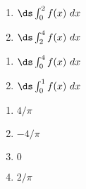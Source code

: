 {\noindent
\begin{minipage}{\linewidth}
\end{minipage}
\noindent\begin{minipage}[t]{.5\linewidth}
\begin{enumerate}
\item		$\ds \int_0^2 f(x)\ dx$
\item		$\ds \int_2^4 f(x)\ dx$
\end{enumerate}
\end{minipage}
\begin{minipage}[t]{.5\linewidth}
\begin{enumerate}\addtocounter{enumii}{2}
\item		$\ds \int_0^4 f(x)\ dx$
\item		$\ds \int_0^1 f(x)\ dx$
\end{enumerate}
\end{minipage}
}
{\begin{enumerate}
\item		$4/\pi$
\item		$-4/\pi$
\item		$0$
\item		$2/\pi$
\end{enumerate}
}

